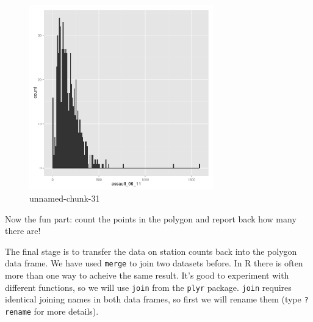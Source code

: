 \documentclass[]{article}
\newenvironment{Shaded}{}{}
\newcommand{\KeywordTok}[1]{\textcolor[rgb]{0.00,0.44,0.13}{\textbf{{#1}}}}
\newcommand{\StringTok}[1]{\textcolor[rgb]{0.25,0.44,0.63}{{#1}}}
\newcommand{\NormalTok}[1]{{#1}}
\begin{document}
\begin{Shaded}
\end{Shaded}
\begin{figure}[htbp]
\centering
\includegraphics[width=8cm]{figure/unnamed-chunk-31.png}
\caption{unnamed-chunk-31}
\end{figure}

Now the fun part: count the points in the polygon and report back how
many there are!

The final stage is to transfer the data on station counts back into the
polygon data frame. We have used \texttt{merge} to join two datasets
before. In R there is often more than one way to acheive the same
result. It's good to experiment with different functions, so we will use
\texttt{join} from the \texttt{plyr} package. \texttt{join} requires
identical joining names in both data frames, so first we will rename
them (type \texttt{?rename} for more details).
\end{document}
